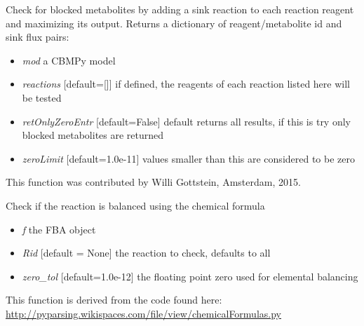 \documentclass[a4paper,11pt,english]{sphinxmanual}
\begin{document}
\begin{fulllineitems}
\label{modules_doc:cbmpy.CBTools.checkProducibilityReactions}
Check for blocked metabolites by adding a sink reaction to each reaction reagent and maximizing
its output. Returns a dictionary of reagent/metabolite id and sink flux pairs:
\begin{itemize}
\item {} 
\emph{mod} a CBMPy model

\item {} 
\emph{reactions} {[}default={[}{]}{]} if defined, the reagents of each reaction listed here will be tested

\item {} 
\emph{retOnlyZeroEntr} {[}default=False{]} default returns all results, if this is try only blocked metabolites are returned

\item {} 
\emph{zeroLimit} {[}default=1.0e-11{]} values smaller than this are considered to be zero

\end{itemize}

This function was contributed by Willi Gottstein, Amsterdam, 2015.

\end{fulllineitems}


\begin{fulllineitems}
\label{modules_doc:cbmpy.CBTools.checkReactionBalanceElemental}
Check if the reaction is balanced using the chemical formula
\begin{itemize}
\item {} 
\emph{f} the FBA object

\item {} 
\emph{Rid} {[}default = None{]} the reaction to check, defaults to all

\item {} 
\emph{zero\_tol} {[}default=1.0e-12{]} the floating point zero used for elemental balancing

\end{itemize}

This function is derived from the code found here: \url{http://pyparsing.wikispaces.com/file/view/chemicalFormulas.py}

\end{fulllineitems}
\end{document}

